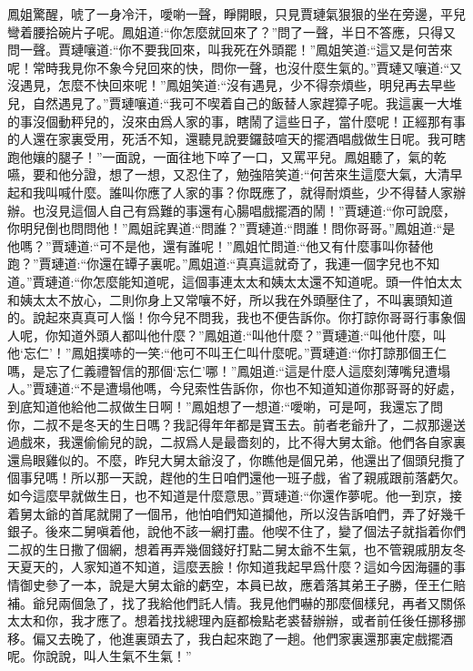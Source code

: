 \begin{parag}
    鳳姐驚醒，唬了一身冷汗，噯喲一聲，睜開眼，只見賈璉氣狠狠的坐在旁邊，平兒彎着腰拾碗片子呢。鳳姐道:“你怎麼就回來了？”問了一聲，半日不答應，只得又問一聲。賈璉嚷道:“你不要我回來，叫我死在外頭罷！”鳳姐笑道:“這又是何苦來呢！常時我見你不象今兒回來的快，問你一聲，也沒什麼生氣的。”賈璉又嚷道:“又沒遇見，怎麼不快回來呢！”鳳姐笑道:“沒有遇見，少不得奈煩些，明兒再去早些兒，自然遇見了。”賈璉嚷道:“我可不喫着自己的飯替人家趕獐子呢。我這裏一大堆的事沒個動秤兒的，沒來由爲人家的事，瞎鬧了這些日子，當什麼呢！正經那有事的人還在家裏受用，死活不知，還聽見說要鑼鼓喧天的擺酒唱戲做生日呢。我可瞎跑他孃的腿子！”一面說，一面往地下啐了一口，又罵平兒。鳳姐聽了，氣的乾嚥，要和他分證，想了一想，又忍住了，勉強陪笑道:“何苦來生這麼大氣，大清早起和我叫喊什麼。誰叫你應了人家的事？你既應了，就得耐煩些，少不得替人家辦辦。也沒見這個人自己有爲難的事還有心腸唱戲擺酒的鬧！”賈璉道:“你可說麼，你明兒倒也問問他！”鳳姐詫異道:“問誰？”賈璉道:“問誰！問你哥哥。”鳳姐道:“是他嗎？”賈璉道:“可不是他，還有誰呢！”鳳姐忙問道:“他又有什麼事叫你替他跑？”賈璉道:“你還在罈子裏呢。”鳳姐道:“真真這就奇了，我連一個字兒也不知道。”賈璉道:“你怎麼能知道呢，這個事連太太和姨太太還不知道呢。頭一件怕太太和姨太太不放心，二則你身上又常嚷不好，所以我在外頭壓住了，不叫裏頭知道的。說起來真真可人惱！你今兒不問我，我也不便告訴你。你打諒你哥哥行事象個人呢，你知道外頭人都叫他什麼？”鳳姐道:“叫他什麼？”賈璉道:“叫他什麼，叫他‘忘仁’！”鳳姐撲哧的一笑:“他可不叫王仁叫什麼呢。”賈璉道:“你打諒那個王仁嗎，是忘了仁義禮智信的那個‘忘仁’哪！”鳳姐道:“這是什麼人這麼刻薄嘴兒遭塌人。”賈璉道:“不是遭塌他嗎，今兒索性告訴你，你也不知道知道你那哥哥的好處，到底知道他給他二叔做生日啊！”鳳姐想了一想道:“噯喲，可是呵，我還忘了問你，二叔不是冬天的生日嗎？我記得年年都是寶玉去。前者老爺升了，二叔那邊送過戲來，我還偷偷兒的說，二叔爲人是最嗇刻的，比不得大舅太爺。他們各自家裏還烏眼雞似的。不麼，昨兒大舅太爺沒了，你瞧他是個兄弟，他還出了個頭兒攬了個事兒嗎！所以那一天說，趕他的生日咱們還他一班子戲，省了親戚跟前落虧欠。如今這麼早就做生日，也不知道是什麼意思。”賈璉道:“你還作夢呢。他一到京，接着舅太爺的首尾就開了一個吊，他怕咱們知道攔他，所以沒告訴咱們，弄了好幾千銀子。後來二舅嗔着他，說他不該一網打盡。他喫不住了，變了個法子就指着你們二叔的生日撒了個網，想着再弄幾個錢好打點二舅太爺不生氣，也不管親戚朋友冬天夏天的，人家知道不知道，這麼丟臉！你知道我起早爲什麼？這如今因海疆的事情御史參了一本，說是大舅太爺的虧空，本員已故，應着落其弟王子勝，侄王仁賠補。爺兒兩個急了，找了我給他們託人情。我見他們嚇的那麼個樣兒，再者又關係太太和你，我才應了。想着找找總理內庭都檢點老裘替辦辦，或者前任後任挪移挪移。偏又去晚了，他進裏頭去了，我白起來跑了一趟。他們家裏還那裏定戲擺酒呢。你說說，叫人生氣不生氣！”
\end{parag}


